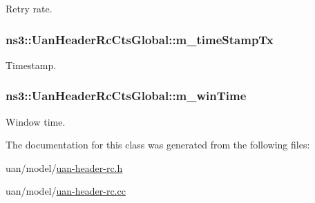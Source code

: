 Retry rate. 

\subsubsection[{\texorpdfstring{m\+\_\+time\+Stamp\+Tx}{m_timeStampTx}}]{ ns3\+::\+Uan\+Header\+Rc\+Cts\+Global\+::m\+\_\+time\+Stamp\+Tx\hspace{0.3cm}{\ttfamily [private]}}\hypertarget{classns3_1_1UanHeaderRcCtsGlobal_a82d4b0313adc6b3fa9a2a298a50e05e7}{}\label{classns3_1_1UanHeaderRcCtsGlobal_a82d4b0313adc6b3fa9a2a298a50e05e7}


Timestamp. 

\subsubsection[{\texorpdfstring{m\+\_\+win\+Time}{m_winTime}}]{ ns3\+::\+Uan\+Header\+Rc\+Cts\+Global\+::m\+\_\+win\+Time\hspace{0.3cm}{\ttfamily [private]}}\hypertarget{classns3_1_1UanHeaderRcCtsGlobal_a94365aeacbedf98a9a92b3c310a591d3}{}\label{classns3_1_1UanHeaderRcCtsGlobal_a94365aeacbedf98a9a92b3c310a591d3}


Window time. 



The documentation for this class was generated from the following files\+:\begin{DoxyCompactItemize}
\item 
uan/model/\hyperlink{uan-header-rc_8h}{uan-\/header-\/rc.\+h}\item 
uan/model/\hyperlink{uan-header-rc_8cc}{uan-\/header-\/rc.\+cc}\end{DoxyCompactItemize}
